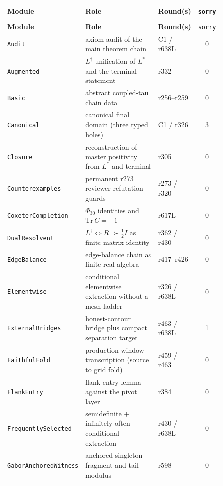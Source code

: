 \documentclass[11pt]{article}
\theoremstyle{definition}
\theoremstyle{remark}
\begin{document}
\begingroup\small
\begin{longtable}{@{}
  >{\raggedright\arraybackslash}p{0.28\linewidth}
  >{\raggedright\arraybackslash}p{0.40\linewidth}
  >{\raggedright\arraybackslash}p{0.18\linewidth}
  c@{}}
\toprule
\textbf{Module} & \textbf{Role} & \textbf{Round(s)} & \texttt{sorry}\\
\midrule
\endfirsthead
\multicolumn{4}{c}{\small\itshape Complete Lean module inventory (continued)}\\
\toprule
\textbf{Module} & \textbf{Role} & \textbf{Round(s)} & \texttt{sorry}\\
\midrule
\endhead
\texttt{Audit} & axiom audit of the main theorem chain & C1 / r638L & 0\\
\texttt{Augmented} & $L^{\dagger}$ unification of $L^*$ and the terminal statement & r332 & 0\\
\texttt{Basic} & abstract coupled-tau chain data & r256--r259 & 0\\
\texttt{Canonical} & canonical final domain (three typed holes) & C1 / r326 & 3\\
\texttt{Closure} & reconstruction of master positivity from $L^*$ and terminal & r305 & 0\\
\texttt{Counterexamples} & permanent r273 reviewer refutation guards & r273 / r320 & 0\\
\texttt{CoxeterCompletion} & $\Phi_{30}$ identities and $\mathrm{Tr}\,C=-1$ & r617L & 0\\
\texttt{DualResolvent} & $L^{\dagger}\Leftrightarrow R^{\dagger}\succ\tfrac12 I$ as finite matrix identity & r362 / r430 & 0\\
\texttt{EdgeBalance} & edge-balance chain as finite real algebra & r417--r426 & 0\\
\texttt{Elementwise} & conditional elementwise extraction without a mesh ladder & r326 / r638L & 0\\
\texttt{ExternalBridges} & honest-contour bridge plus compact separation target & r463 / r638L & 1\\
\texttt{FaithfulFold} & production-window transcription (source to grid fold) & r459 / r463 & 0\\
\texttt{FlankEntry} & flank-entry lemma against the pivot layer & r384 & 0\\
\texttt{FrequentlySelected} & semidefinite $+$ infinitely-often conditional extraction & r430 / r638L & 0\\
\texttt{GaborAnchoredWitness} & anchored singleton fragment and tail modulus & r598 & 0\\

\end{longtable}
\end{document}
